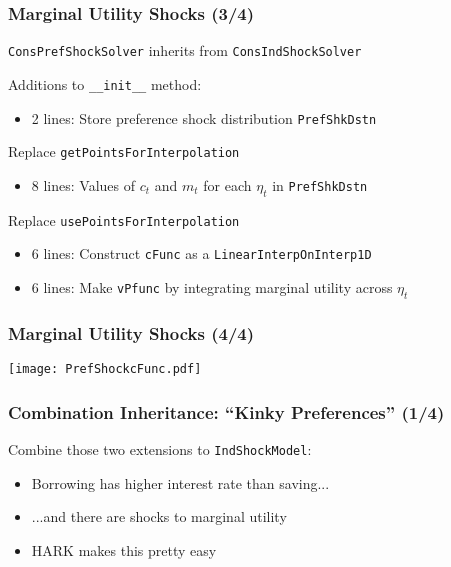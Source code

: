 \documentclass[11ptt]{beamer}
\begin{document}
\begin{frame}
\frametitle{Marginal Utility Shocks (3/4)}
\texttt{ConsPrefShockSolver} inherits from \texttt{ConsIndShockSolver}

\begin{block}{Additions to \texttt{\_\_init\_\_} method:}
\begin{itemize}
\item 2 lines: Store preference shock distribution \texttt{PrefShkDstn}
\end{itemize}
\end{block}

\begin{block}{Replace \texttt{getPointsForInterpolation}}
\begin{itemize}
\item 8 lines: Values of $c_t$ and $m_t$ for each $\eta_t$ in \texttt{PrefShkDstn}
\end{itemize}
\end{block}

\begin{block}{Replace \texttt{usePointsForInterpolation}}
\begin{itemize}
\item 6 lines: Construct \texttt{cFunc} as a \texttt{LinearInterpOnInterp1D}

\item 6 lines: Make \texttt{vPfunc} by integrating marginal utility across $\eta_t$
\end{itemize}
\end{block}
\end{frame}

\begin{frame}
\frametitle{Marginal Utility Shocks (4/4)}
\begin{center}
\texttt{[image: PrefShockcFunc.pdf]}
\end{center}
\end{frame}

\begin{frame}
\frametitle{Combination Inheritance: ``Kinky Preferences'' (1/4)}
Combine those two extensions to \texttt{IndShockModel}:
\begin{itemize}
\item Borrowing has higher interest rate than saving...

\item ...and there are shocks to marginal utility

\item HARK makes this pretty easy
\end{itemize}
\end{frame}
\end{document}
